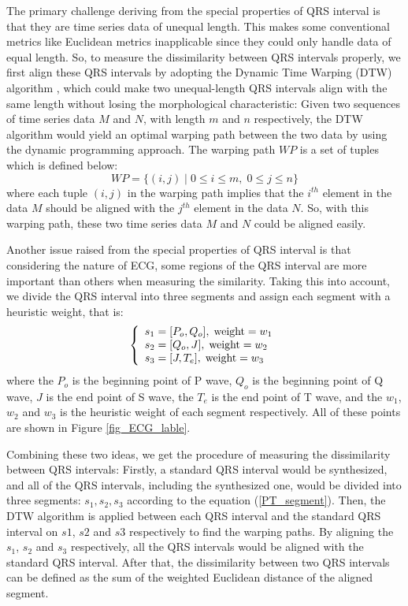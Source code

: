 \documentclass[conference]{IEEEtran}
\begin{document}
The primary challenge deriving from the special properties of QRS interval is that they are time series data of unequal length. This makes some conventional metrics like Euclidean metrics inapplicable since they could only handle data of equal length. So, to measure the dissimilarity between QRS intervals properly, we first align these QRS intervals by adopting the Dynamic Time Warping (DTW) algorithm \cite{sakoe1978dynamic}, which could make two unequal-length QRS intervals align with the same length without losing the morphological characteristic: Given two sequences of time series data $ M $ and $ N $, with length $ m $ and $ n $ respectively, the DTW algorithm would yield an optimal warping path between the two data by using the dynamic programming approach. The warping path $  WP $ is a set of tuples which is defined below:
\begin{equation}
WP = \{ (i, j) \; | \; 0 \leq i \leq m, \; 0 \leq j \leq n  \}
\end{equation}
where each tuple $ (i, j) $ in the warping path implies that the $ i^{th} $ element in the data $ M $ should be aligned with the $ j^{th} $ element in the data $ N $. So, with this warping path, these two time series data $ M $ and $ N $ could be aligned easily.


Another issue raised from the special properties of QRS interval is that considering the nature of ECG, some regions of the QRS interval are more important than others when measuring the similarity. Taking this into account, we divide the QRS interval into three segments and assign each segment with a heuristic weight, that is:
\begin{equation}\label{PT_segment}
\left\{ \begin{array}{ll}
s_1 = [P_o, Q_o], \; \textmd{weight}=w_1\\
s_2 = [Q_o, J], \;  \textmd{weight}=w_2\\
s_3 = [J, T_e], \; \textmd{weight}=w_3
\end{array} \right.
\end{equation}
where the $ P_o $ is the beginning point of P wave, $ Q_o $ is the beginning point of Q wave, $ J $ is the end point of S wave, the $ T_e $ is the end point of T wave, and the $ w_1 $, $ w_2 $ and $ w_3 $ is the heuristic weight of each segment respectively. All of these points are shown in Figure \ref{fig_ECG_lable}.


Combining these two ideas, we get the procedure of measuring the dissimilarity between QRS intervals: Firstly, a standard QRS interval would be synthesized, and all of the QRS intervals, including the synthesized one, would be divided into three segments: $ s_1, s_2, s_3 $ according to the equation (\ref{PT_segment}). Then, the DTW algorithm is applied between each QRS interval and the standard QRS interval on $ s1 $, $ s2 $ and $ s3 $ respectively to find the warping paths. By aligning the $ s_1 $, $ s_2 $ and $ s_3 $ respectively, all the QRS intervals would be aligned with the standard QRS interval. After that, the dissimilarity between two QRS intervals can be defined as the sum of the weighted Euclidean distance of the aligned segment. 
\end{document}
